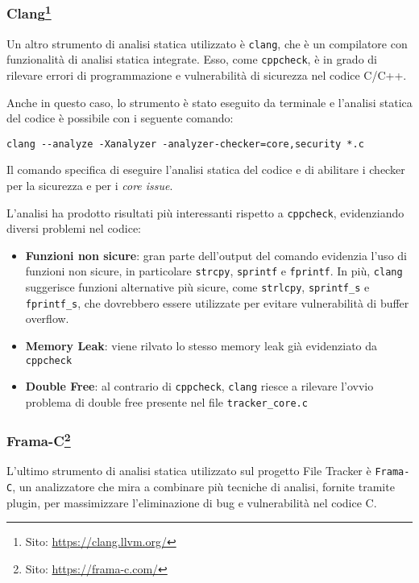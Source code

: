 \subsubsection*{\small Clang\footnote{Sito: \url{https://clang.llvm.org/}}}
Un altro strumento di analisi statica utilizzato è \texttt{clang}, che è un compilatore
con funzionalità di analisi statica integrate. Esso, come \texttt{cppcheck}, è in
grado di rilevare errori di programmazione e vulnerabilità di sicurezza nel codice
C/C++.

Anche in questo caso, lo strumento è stato eseguito da terminale e l'analisi
statica del codice è possibile con i seguente comando: \begin{lstlisting}[language={}, numbers=none]
clang --analyze -Xanalyzer -analyzer-checker=core,security *.c
\end{lstlisting}
Il comando specifica di eseguire l'analisi statica del codice e di abilitare i checker
per la sicurezza e per i \textit{core issue}.

L'analisi ha prodotto risultati più interessanti rispetto a \texttt{cppcheck},
evidenziando diversi problemi nel codice:
\begin{itemize}
  \item \textbf{Funzioni non sicure}: gran parte dell'output del comando evidenzia
    l'uso di funzioni non sicure, in particolare \texttt{strcpy}, \texttt{sprintf}
    e \texttt{fprintf}. In più, \texttt{clang} suggerisce funzioni alternative più
    sicure, come \texttt{strlcpy}, \texttt{sprintf\_s} e \texttt{fprintf\_s}, che
    dovrebbero essere utilizzate per evitare vulnerabilità di buffer overflow.

  \item \textbf{Memory Leak}: viene rilvato lo stesso memory leak già evidenziato
    da \texttt{cppcheck}

  \item \textbf{Double Free}: al contrario di \texttt{cppcheck}, \texttt{clang}
    riesce a rilevare l'ovvio problema di double free presente nel file \texttt{tracker\_core.c}
\end{itemize}

\medskip

\subsubsection*{\small Frama-C\footnote{Sito: \url{https://frama-c.com/}}}
L'ultimo strumento di analisi statica utilizzato sul progetto File Tracker è \texttt{Frama-C},
un analizzatore che mira a combinare più tecniche di analisi, fornite tramite
plugin, per massimizzare l'eliminazione di bug e vulnerabilità nel codice C.

